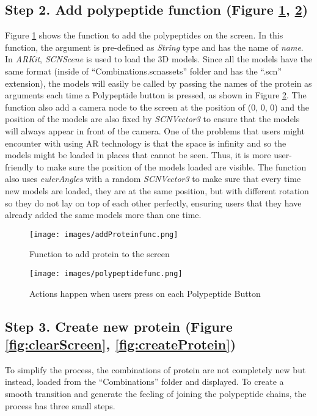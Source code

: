 \subsection{Step 2. Add polypeptide function (Figure \ref{fig:addProteinfunc}, \ref{fig:polypeptidefunc})}
Figure \ref{fig:addProteinfunc} shows the function to add the polypeptides on the screen. In this function, the argument is pre-defined as \emph{String} type and has the name of \emph{name}. In \emph{ARKit}, \emph{SCNScene} is used to load the 3D models. Since all the models have the same format (inside of “Combinations.scnassets” folder and has the “.scn” extension), the models will easily be called by passing the names of the protein as arguments each time a Polypeptide button is pressed, as shown in Figure \ref{fig:polypeptidefunc}. 
The function also add a camera node to the screen at the position of (0, 0, 0) and the position of the models are also fixed by \emph{SCNVector3} to ensure that the models will always appear in front of the camera. One of the problems that users might encounter with using AR technology is that the space is infinity and so the models might be loaded in places that cannot be seen. Thus, it is more user-friendly to make sure the position of the models loaded are visible. The function also uses \emph{eulerAngles} with a random \emph{SCNVector3} to make sure that every time new models are loaded, they are at the same position, but with different rotation so they do not lay on top of each other perfectly, ensuring users that they have already added the same models more than one time. 
\begin{figure}[!htp]
	\centering
	\texttt{[image: images/addProteinfunc.png]}
	\caption{Function to add protein to the screen}
	\label{fig:addProteinfunc}
\end{figure}

\begin{figure}[!htp]
	\centering
	\texttt{[image: images/polypeptidefunc.png]}
	\caption{Actions happen when users press on each Polypeptide Button}
	\label{fig:polypeptidefunc}
\end{figure}


\subsection{Step 3. Create new protein (Figure \ref{fig:clearScreen}, \ref{fig:createProtein})}
To simplify the process, the combinations of protein are not completely new but instead, loaded from the “Combinations” folder and displayed. To create a smooth transition and generate the feeling of joining the polypeptide chains, the process has three small steps. 

